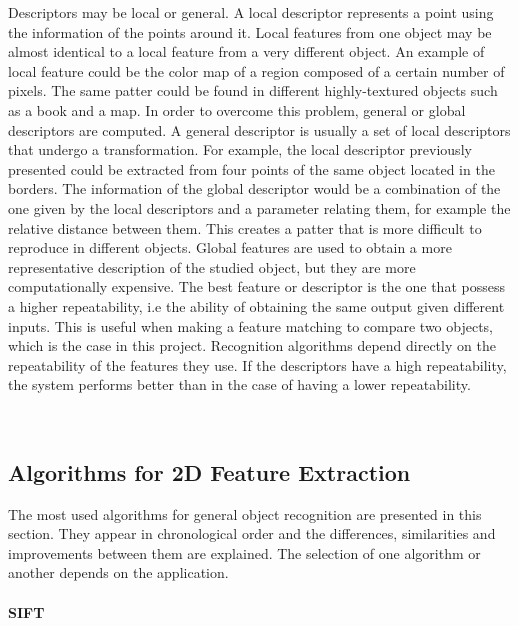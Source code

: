 Descriptors may be local or general. 
A local descriptor represents a point using the information of the points around it. 
Local features from one object may be almost identical to a local feature from a very different object. 
An example of local feature could be the color map of a region composed of a certain number of pixels. 
The same patter could be found in different highly-textured objects such as a book and a map. 
In order to overcome this problem, general or global descriptors are computed. 
A general descriptor is usually a set of local descriptors that undergo a transformation. 
For example, the local descriptor previously presented could be extracted from four points of the same object located in the borders. 
The information of the global descriptor would be a combination of the one given by the local descriptors and a parameter relating them, for example the relative distance between them. 
This creates a patter that is more difficult to reproduce in different objects. 
Global features are used to obtain a more representative description of the studied object, but they are more computationally expensive. 
The best feature or descriptor is the one that possess a higher repeatability, i.e the ability of obtaining the same output given different inputs. 
This is useful when making a feature matching to compare two objects, which is the case in this project. 
Recognition algorithms depend directly on the repeatability of the features they use. 
If the descriptors have a high repeatability, the system performs better than in the case of having a lower repeatability. 

\\

\subsection{Algorithms for 2D Feature Extraction}
\label{2d_features}


The most used algorithms for general object recognition are presented in this section. 
They appear in chronological order and the differences, similarities and improvements between them are explained. 
The selection of one algorithm or another depends on the application.


\paragraph{SIFT}\mbox{}\\
\label{sift}

